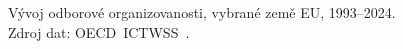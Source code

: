 \def\strStavHustotaVyvojTitle{Odborová organizovanost}%
\def\strStavHustotaVyvojYlabel{odborová organizovanost [\% zaměstnanců]}%
\def\strStavHustotaVyvojCaption{Vývoj odborové organizovanosti, vybrané země EU, 1993--2024. Zdroj dat: \acs{OECD}~\acs{ICTWSS}~\cite{oecd_aias_ictwss_TUD_pct}.}%
%

\providecommand\NudgeStavHustotaVyvojCz{0pt}%
\providecommand\NudgeStavHustotaVyvojAt{0pt}%
\providecommand\NudgeStavHustotaVyvojDe{0pt}%
\providecommand\NudgeStavHustotaVyvojDk{0pt}%
\providecommand\NudgeStavHustotaVyvojPl{0pt}%
\providecommand\NudgeStavHustotaVyvojSk{0pt}%
\begin{figure}[H]
  \centering
  \resizebox{\linewidth}{!}{}
  \caption{\strStavHustotaVyvojCaption}
  \label{fig:stav_hustota_vyvoj}
\end{figure}
